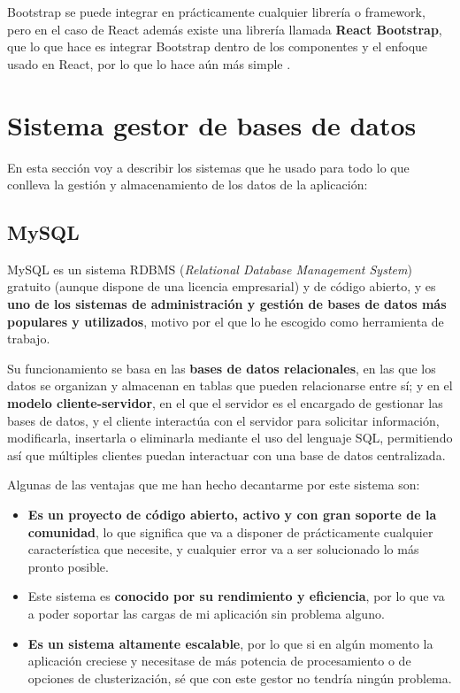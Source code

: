 Bootstrap se puede integrar en prácticamente cualquier librería o framework, pero en el caso de React además existe una librería llamada \textbf{React Bootstrap}, que lo que hace es integrar Bootstrap dentro de los componentes y el enfoque usado en React, por lo que lo hace aún más simple \cite{react-bootstrap:main}.


\section{Sistema gestor de bases de datos}

En esta sección voy a describir los sistemas que he usado para todo lo que conlleva la gestión y almacenamiento de los datos de la aplicación:

\subsection{MySQL}

MySQL es un sistema RDBMS (\textit{Relational Database Management System}) gratuito (aunque dispone de una licencia empresarial) y de código abierto, y es \textbf{uno de los sistemas de administración y gestión de bases de datos más populares y utilizados}, motivo por el que lo he escogido como herramienta de trabajo.

Su funcionamiento se basa en las \textbf{bases de datos relacionales}, en las que los datos se organizan y almacenan en tablas que pueden relacionarse entre sí; y en el \textbf{modelo cliente-servidor}, en el que el servidor es el encargado de gestionar las bases de datos, y el cliente interactúa con el servidor para solicitar información, modificarla, insertarla o eliminarla mediante el uso del lenguaje SQL, permitiendo así que múltiples clientes puedan interactuar con una base de datos centralizada. \cite{wikipedia:mysql}

Algunas de las ventajas que me han hecho decantarme por este sistema son:

\begin{itemize}
  \item \textbf{Es un proyecto de código abierto, activo y con gran soporte de la comunidad}, lo que significa que va a disponer de prácticamente cualquier característica que necesite, y cualquier error va a ser solucionado lo más pronto posible.
  \item Este sistema es \textbf{conocido por su rendimiento y eficiencia}, por lo que va a poder soportar las cargas de mi aplicación sin problema alguno.
  \item \textbf{Es un sistema altamente escalable}, por lo que si en algún momento la aplicación creciese y necesitase de más potencia de procesamiento o de opciones de clusterización, sé que con este gestor no tendría ningún problema.
\end{itemize}


